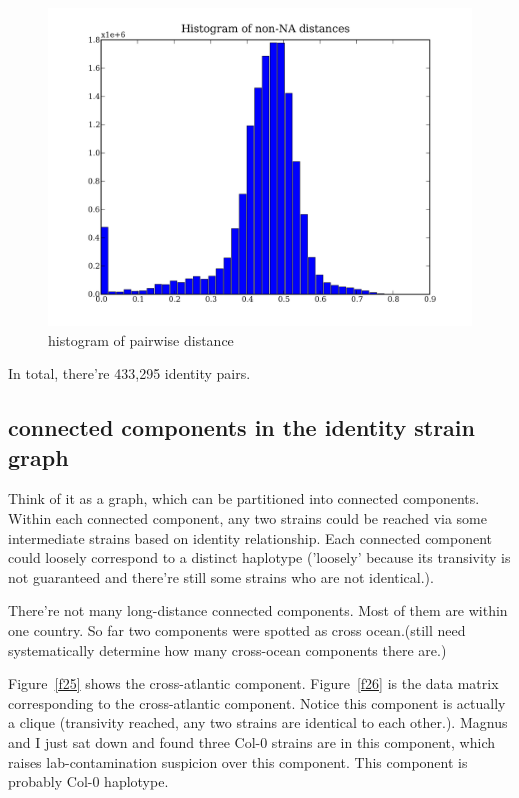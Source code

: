 \documentclass[a4paper,10pt]{article}
\begin{document}
\begin{figure}
\includegraphics[width=1\textwidth]{figures/data_d110_c0_5_distance_hist.png}
\caption{histogram of pairwise distance}\label{f29}
\end{figure}


In total, there're 433,295 identity pairs.

\subsection{connected components in the identity strain graph}
Think of it as a graph, which can be partitioned into connected components. Within each connected component, any two strains could be reached via some intermediate strains based on identity relationship. Each connected component could loosely correspond to a distinct haplotype ('loosely' because its transivity is not guaranteed and there're still some strains who are not identical.).

There're not many long-distance connected components. Most of them are within one country. So far two components were spotted as cross ocean.(still need systematically determine how many cross-ocean components there are.)

Figure~\ref{f25} shows the cross-atlantic component. Figure~\ref{f26} is the data matrix corresponding to the cross-atlantic component. Notice this component is actually a clique (transivity reached, any two strains are identical to each other.). Magnus and I just sat down and found three Col-0 strains are in this component, which raises lab-contamination suspicion over this component. This component is probably Col-0 haplotype.
\end{document}
